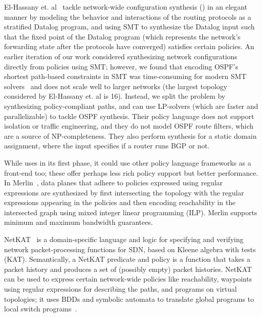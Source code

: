 El-Hassany et. al~\cite{synet} tackle network-wide configuration
synthesis () in an elegant manner by
modeling the behavior and interactions of the routing protocols as a
stratified Datalog program, and using SMT to synthesize the Datalog
input such that the fixed point of the Datalog program (which
represents the network's forwarding state after the protocols have
converged) satisfies certain policies.  An earlier iteration of our
work considered synthesizing network configurations directly from
policies using SMT; however, we found that encoding OSPF's shortest
path-based constraints in SMT was time-consuming for modern SMT
solvers~\cite{z3} and does not scale well to larger networks (the
largest topology considered by El-Hassany et. al is 16). Instead, we
split the problem by synthesizing policy-compliant paths, and can use
LP-solvers (which are faster and parallelizable) to tackle OSPF
synthesis.  Their policy language does not support isolation or
traffic engineering, and they do not model OSPF route filters, which
are a source of NP-completeness.  They also perform synthesis for a
static domain assignment, where the input specifies if a router runs
BGP or not.

 While \name uses \genesis in its first
phase, it could use other policy language frameworks as a front-end
too; these offer perhaps less rich policy support but better
performance. %
In Merlin~\cite{merlin}, data planes that adhere to policies expressed
using regular expressions are synthesized by first intersecting the
topology with the regular expressions appearing in the policies and
then encoding reachability in the intersected graph using mixed
integer linear programming (ILP).  Merlin supports minimum and maximum
bandwidth guarantees.

NetKAT~\cite{netkat} is a domain-specific language and logic for 
specifying and verifying network packet-processing functions
for SDN, based on Kleene algebra with tests (KAT). Semantically,
a NetKAT predicate and policy is a function that takes a packet
history and produces a set of (possibly empty) packet histories. 
NetKAT can be used to express certain network-wide policies like 
reachability, waypoints using regular expressions for describing the paths, 
and programs on virtual topologies; it uses
BDDs and symbolic automata to translate global programs to local
switch programs~\cite{netkatcompiler}.

